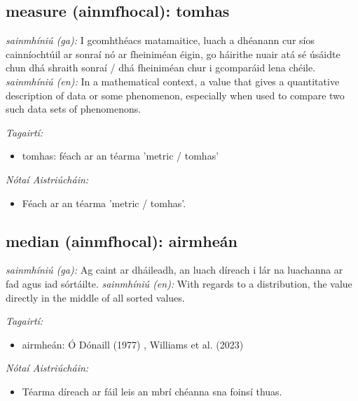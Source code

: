 \documentclass{article}
\begin{document}
\subsection*{measure (ainmfhocal): tomhas} 
 \noindent \textit{sainmhíniú (ga):} I gcomhthéacs matamaitice, luach a dhéanann cur síos cainníochtúil ar sonraí nó ar fheiniméan éigin, go háirithe nuair atá sé úsáidte chun dhá shraith sonraí / dhá fheiniméan chur i gcomparáid lena chéile.
\newline\newline
 \noindent \textit{sainmhíniú (en):} In a mathematical context, a value that gives a quantitative description of data or some phenomenon, especially when used to compare two such data sets of phenomenons.
\newline

 \noindent \textit{Tagairtí:}
\begin{itemize}
	\item tomhas: féach ar an téarma 'metric / tomhas'
\end{itemize}

 \noindent \textit{Nótaí Aistriúcháin:}
\begin{itemize}
	\item Féach ar an téarma 'metric / tomhas'.
\end{itemize}


\subsection*{median (ainmfhocal): airmheán} 
 \noindent \textit{sainmhíniú (ga):} Ag caint ar dháileadh, an luach díreach i lár na luachanna ar fad agus iad sórtáilte.
\newline\newline
 \noindent \textit{sainmhíniú (en):} With regards to a distribution, the value directly in the middle of all sorted values.
\newline

 \noindent \textit{Tagairtí:}
\begin{itemize}
	\item airmheán: Ó Dónaill (1977) \cite{odonaill}, Williams et al. (2023) \cite{storchiste}
\end{itemize}

 \noindent \textit{Nótaí Aistriúcháin:}
\begin{itemize}
	\item Téarma díreach ar fáil leis an mbrí chéanna sna foinsí thuas.
\end{itemize}
\end{document}
